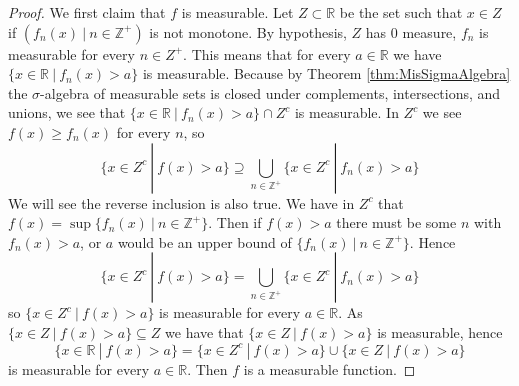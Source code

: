 \documentclass{report}
\newcommand{\Z}{\mathbb{Z}}
\newcommand{\R}{\mathbb{R}}
\begin{document}
\begin{proof}
We first claim that $f$ is measurable. Let $Z \subset \R$ be the set such that $x \in Z$ if $(f_n(x) \ | \ n \in \Z^+)$ is not monotone.
By hypothesis, $Z$ has 0 measure, $f_n$ is measurable for every $n \in Z^+$.
This means that for every $a \in \R$ we have $\{ x \in \R \ | \ f_n(x) > a \}$  is measurable.
Because by Theorem \ref{thm:MisSigmaAlgebra} the $\sigma$-algebra of measurable sets is closed under complements, intersections, and unions, we see that $\{ x \in \R \ | \ f_n(x) > a \}\cap Z^c$ is measurable.
In $Z^c$ we see $f(x) \geq f_n(x)$ for every $n$, so
$$
\{ x \in Z^c \ | \ f(x) > a \} \supseteq \bigcup_{n\in \Z^+} \{ x \in Z^c \ | \ f_n(x) > a \}
$$
We will see the reverse inclusion is also true. We have in $Z^c$ that $f(x)=\sup  \{ f_n(x) \ | \ n\in \Z^+ \}$.
Then if $f(x)>a$ there must be some $n$ with $f_n(x)>a$, or $a$ would be an upper bound of $\{ f_n(x) \ | \ n\in \Z^+ \}$.
Hence
$$
\{ x \in Z^c \ | \ f(x) > a \} = \bigcup_{n\in \Z^+}  \{ x \in Z^c \ | \ f_n(x) > a \}
$$
so $\{ x \in Z^c\ | \ f(x) > a \}$ is measurable for every $a \in \R$. As $\{ x \in Z \ | \ f(x)>a \} \subseteq Z$ we have that $\{ x \in Z \ | \ f(x)>a \}$ is measurable, hence 
$$
\{x \in \R\ | \ f(x) > a\}=\{x \in Z^c\ | \ f(x) > a\} \cup \{x \in Z \ | \ f(x) > a\}
$$
is measurable for every $a \in \R$. Then $f$ is a measurable function.


\end{proof}
\end{document}
